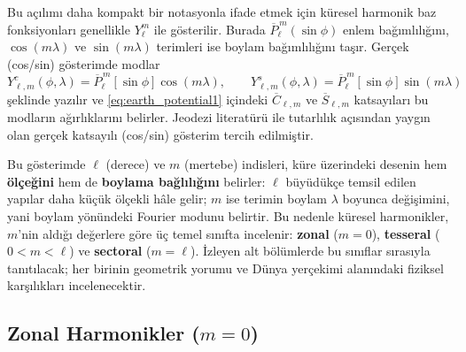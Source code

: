Bu açılımı daha kompakt bir notasyonla ifade etmek için küresel harmonik baz fonksiyonları genellikle $Y_{\ell}^{m}$ ile gösterilir.
Burada $\overline{P}_{\ell}^{\,m}(\sin\phi)$ enlem bağımlılığını, $\cos(m\lambda)$ ve $\sin(m\lambda)$ terimleri ise boylam bağımlılığını taşır.
Gerçek (cos/sin) gösterimde modlar
\[
Y_{\ell, m}^{c}(\phi,\lambda)=\overline{P}_{\ell}^{\,m}[\sin\phi]\cos(m\lambda),
\qquad
Y_{\ell, m}^{s}(\phi,\lambda)=\overline{P}_{\ell}^{\,m}[\sin\phi]\sin(m\lambda)
\]
şeklinde yazılır ve \eqref{eq:earth_potential1} içindeki $\overline{C}_{\ell, m}$ ve $\overline{S}_{\ell, m}$ katsayıları bu modların ağırlıklarını belirler. Jeodezi literatürü ile tutarlılık açısından yaygın olan gerçek katsayılı (cos/sin) gösterim tercih edilmiştir.

\medskip
\noindent
Bu gösterimde $\ell$ (derece) ve $m$ (mertebe) indisleri, küre üzerindeki desenin hem \textbf{ölçeğini} hem de
\textbf{boylama bağlılığını} belirler: $\ell$ büyüdükçe temsil edilen yapılar daha küçük ölçekli hâle gelir;
$m$ ise terimin boylam $\lambda$ boyunca değişimini, yani boylam yönündeki Fourier modunu belirtir.
Bu nedenle küresel harmonikler, $m$’nin aldığı değerlere göre üç temel sınıfta incelenir:
\textbf{zonal} ($m=0$), \textbf{tesseral} ($0<m<\ell$) ve \textbf{sectoral} ($m=\ell$).
İzleyen alt bölümlerde bu sınıflar sırasıyla tanıtılacak; her birinin geometrik yorumu ve
Dünya yerçekimi alanındaki fiziksel karşılıkları incelenecektir.


\begin{center}
\setlength{\fboxsep}{6pt}
\setlength{\fboxrule}{0.6pt}
\end{center}


\newpage
\subsection{Zonal Harmonikler ($m=0$)}
\label{subsec:zonal}

